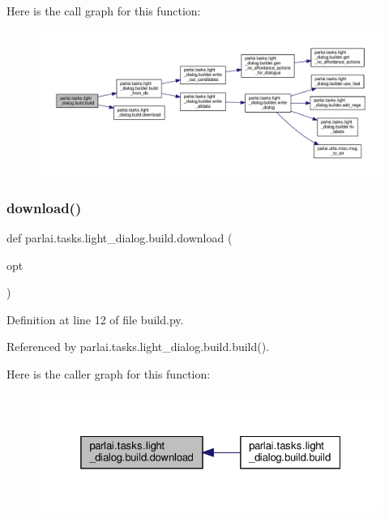 Here is the call graph for this function\+:
\nopagebreak
\begin{figure}[H]
\begin{center}
\leavevmode
\includegraphics[width=350pt]{namespaceparlai_1_1tasks_1_1light__dialog_1_1build_ac8ebc5da2dd660257535226b26afb26e_cgraph}
\end{center}
\end{figure}
\mbox{\label{namespaceparlai_1_1tasks_1_1light__dialog_1_1build_af4e1d56472312e493c43483a2dfff5a3}} 
\subsubsection{\texorpdfstring{download()}{download()}}
{\footnotesize\ttfamily def parlai.\+tasks.\+light\+\_\+dialog.\+build.\+download (\begin{DoxyParamCaption}\item[{}]{opt }\end{DoxyParamCaption})}



Definition at line 12 of file build.\+py.



Referenced by parlai.\+tasks.\+light\+\_\+dialog.\+build.\+build().

Here is the caller graph for this function\+:
\nopagebreak
\begin{figure}[H]
\begin{center}
\leavevmode
\includegraphics[width=325pt]{namespaceparlai_1_1tasks_1_1light__dialog_1_1build_af4e1d56472312e493c43483a2dfff5a3_icgraph}
\end{center}
\end{figure}
